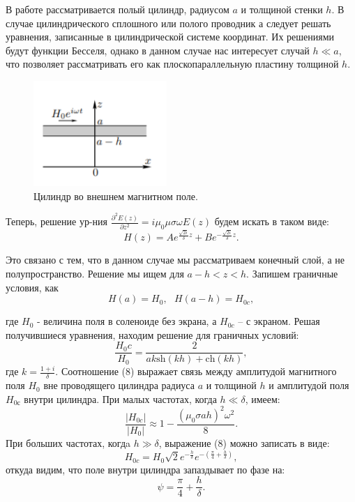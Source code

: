 \documentclass[a4paper, 14pt]{extarticle}%
\newcommand\ECaption[1]{%
     \captionsetup{font=footnotesize}%
     \caption{#1}}
\begin{document}
В работе рассматривается полый цилиндр, радиусом $a$ и толщиной стенки $h$. В случае цилиндрического сплошного или полого проводник
а следует решать уравнения, записанные в цилиндрической системе
координат. Их решениями будут функции Бесселя, однако в данном случае нас интересует случай $h\ll a$, что позволяет рассматривать его как плоскопараллельную пластину толщиной $h$. 

\begin{figure}
\begin{center}
\includegraphics[height=4cm]{teor2.png}
\end{center}
\ECaption{Цилиндр во внешнем магнитном поле.}
\end{figure}

Теперь, решение ур-ния $\frac{\partial^2E(z)}{\partial z^2} = i\mu_0\mu\sigma\omega E(z)$ будем искать в таком виде: 
\[H(z) = Ae^{\frac{\sqrt{2i}}{\delta}z}+ Be^{-\frac{\sqrt{2i}}{\delta}z}.\]

Это связано с тем, что в данном случае мы рассматриваем конечный слой, а не полупространство. Решение мы ищем для $a-h<z<h$. Запишем граничные условия, как 
\[H(a) = H_0, \text{ } H(a-h) = H_{0c},\]

где $H_0$ - величина поля в соленоиде без экрана, а $H_{0c}$ -- с экраном. Решая получившиеся уравнения, находим решение для граничных условий:
\begin{equation}
\dfrac{H_0c}{H_0} = \dfrac{2}{ak\text{sh}(kh) + \text{ch}(kh)},
\end{equation}
где $k = \frac{1+i}{\delta}$. Соотношение (8) выражает связь между амплитудой магнитного поля
$H_0$ вне проводящего цилиндра радиуса $a$ и толщиной $h$ и амплитудой поля $H_{0с}$ внутри цилиндра. При малых частотах, когда $h\ll\delta$, имеем:
\begin{equation}
\dfrac{|H_{0c}|}{|H_0|}\approx 1 - \dfrac{(\mu_0\sigma ah)^2\omega^2}{8}.
\end{equation}
При больших частотах, когдa $h\gg\delta$, выражение (8) можно записать в виде: 
\[H_{0c} = H_0\sqrt{2} e^{-\frac{h}{\delta}}e^{-(\frac{\pi}{4}+\frac{h}{\delta})},\]
откуда видим, что поле внутри цилиндра запаздывает по фазе на:
\begin{equation}
\psi = \frac{\pi}{4}+\frac{h}{\delta}.
\end{equation}
\end{document}
